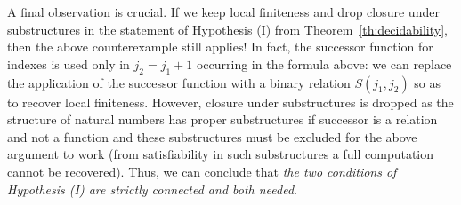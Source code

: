 \documentclass{LMCS}
\theoremstyle{plain}\newtheorem{assumption}[thm]{Assumption}
\theoremstyle{plain}\newtheorem{proposition}[thm]{Proposition}
\theoremstyle{plain}\newtheorem{property}[thm]{Property}
\theoremstyle{plain}\newtheorem{example}[thm]{Example}
\theoremstyle{plain}\newtheorem{claim}[thm]{Claim}
\theoremstyle{plain}\newtheorem{lemma}[thm]{Lemma}
\begin{document}
A final observation is crucial.  If we keep local finiteness and drop
closure under substructures in the statement of Hypothesis (I) from
Theorem~\ref{th:decidability}, then the above counterexample still
applies!  In fact, the successor function for indexes is used only in
$j_2=j_1+1$ occurring in the formula above: we can replace the
application of the successor function with a binary relation $S(j_1,
j_2)$ so as to recover local finiteness.  However, closure under
substructures is dropped as the structure of natural numbers
has proper substructures if successor is a relation and not a function
and these substructures must be excluded for the above argument to
work (from satisfiability in such substructures a full computation
cannot be recovered). Thus, we can conclude that \emph{the two
  conditions of Hypothesis (I) are strictly connected and both
  needed}.

 
\end{document}
